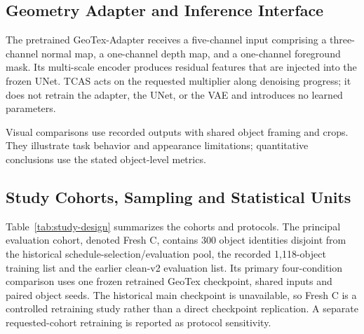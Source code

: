 \documentclass[times,twocolumn,final]{elsarticle}
\begin{document}
\subsection{Geometry Adapter and Inference Interface}
\label{subsec:adapterimpl}

The pretrained GeoTex-Adapter receives a five-channel input comprising a three-channel normal map, a one-channel depth map, and a one-channel foreground mask. Its multi-scale encoder produces residual features that are injected into the frozen UNet. TCAS acts on the requested multiplier along denoising progress; it does not retrain the adapter, the UNet, or the VAE and introduces no learned parameters.

Visual comparisons use recorded outputs with shared object framing and crops. They illustrate task behavior and appearance limitations; quantitative conclusions use the stated object-level metrics.

\subsection{Study Cohorts, Sampling and Statistical Units}
\label{subsec:setup}

Table~\ref{tab:study-design} summarizes the cohorts and protocols. The principal evaluation cohort, denoted Fresh C, contains 300 object identities disjoint from the historical schedule-selection/evaluation pool, the recorded 1,118-object training list and the earlier clean-v2 evaluation list. Its primary four-condition comparison uses one frozen retrained GeoTex checkpoint, shared inputs and paired object seeds. The historical main checkpoint is unavailable, so Fresh C is a controlled retraining study rather than a direct checkpoint replication. A separate requested-cohort retraining is reported as protocol sensitivity.
\end{document}
